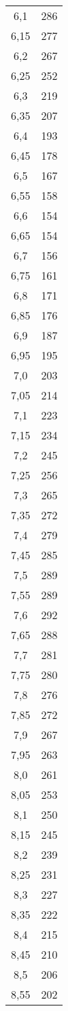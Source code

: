 \begin{longtable}{cc}
6,1  &286\\
6,15 &277\\
6,2  &267\\
6,25 &252\\
6,3  &219\\
6,35 &207\\
6,4  &193\\
6,45 &178\\
6,5  &167\\
6,55 &158\\
6,6  &154\\
6,65 &154\\
6,7  &156\\
6,75 &161\\
6,8  &171\\
6,85 &176\\
6,9  &187\\
6,95 &195\\
7,0  & 203\\
7,05 &214\\
7,1  &223 \\
7,15 &234\\
7,2  &245\\
7,25 &256\\
7,3  &265\\
7,35 &272\\
7,4  &279\\
7,45 &285\\
7,5  &289\\
7,55 &289\\
7,6  &292\\
7,65 &288\\
7,7  &281\\
7,75 &280\\
7,8  &276\\
7,85 &272\\
7,9  &267\\
7,95 &263\\
8,0  &261\\
8,05 &253\\
8,1  &250\\
8,15 &245\\
8,2  &239\\
8,25 &231\\
8,3  &227\\
8,35 &222\\
8,4  &215\\
8,45 &210\\
8,5  &206\\
8,55 &202\\

\end{longtable}
